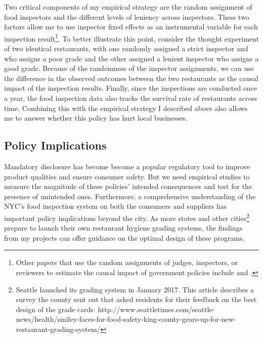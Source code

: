 \documentclass[12pt]{article}
\begin{document}
Two critical components of my empirical strategy are the random assignment of food inspectors and the different levels of leniency across inspectors. These two factors allow me to use inspector fixed effects as an instrumental variable for each inspection result\footnote{Other papers that use the random assignments of judges, inspectors, or reviewers to estimate the causal impact of government policies include \cite{Doyle_07, Doyle_08} and \cite{Maestas_13}.}. To better illustrate this point, consider the thought experiment of two identical restaurants, with one randomly assigned a strict inspector and who assigns a poor grade and the other assigned a lenient inspector who assigns a good grade. Because of the randomness of the inspector assignments, we can use the difference in the observed outcomes between the two restaurants as the causal impact of the inspection results. Finally, since the inspections are conducted once a year, the food inspection data also tracks the survival rate of restaurants across time. Combining this with the empirical strategy I described above also allows me to answer whether this policy has hurt local businesses. 

\subsection*{Policy Implications}

Mandatory disclosure has become become a popular regulatory tool to improve product qualities and ensure consumer safety. But we need empirical studies to measure the magnitude of these policies' intended consequences and test for the presence of unintended ones. Furthermore, a comprehensive understanding of the NYC’s food inspection system on both the consumers and suppliers has important policy implications beyond the city. As more states and other cities\footnote{Seattle launched its grading system in January 2017. This article describes a survey the county sent out that asked residents for their feedback on the best design of the grade cards: http://www.seattletimes.com/seattle-news/health/smiley-faces-for-food-safety-king-county-gears-up-for-new-restaurant-grading-system/} prepare to launch their own restaurant hygiene grading systems, the findings from my projects can offer guidance on the optimal design of these programs. 

\newpage




\end{document}
